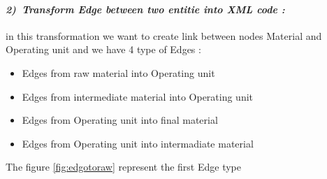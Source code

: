 \paragraph{\emph{2)~Transform Edge between two entitie into XML code :} } in this transformation 
we want to create link between nodes Material and Operating unit 
and we have 4 type of Edges : 
\begin{itemize}

\newcommand{\localtextbulletone}{\textcolor{gray}{\raisebox{.45ex}{\rule{.6ex}{.6ex}}}}
\renewcommand{\labelitemi}{\localtextbulletone}
	\item Edges from raw material into Operating unit
	\item Edges from intermediate material into Operating unit
	
	\item Edges from Operating unit into final material
	\item Edges from Operating unit into intermadiate material 
\end{itemize}
The figure \ref{fig:edgotoraw} represent the first Edge type 
\vspace{1cm}
